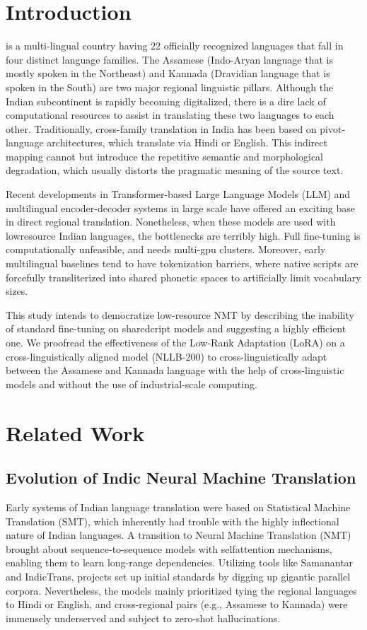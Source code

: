 \documentclass[conference]{IEEEtran}
\begin{document}
\section{Introduction}
 is a multi-lingual country having 22 officially recognized languages that fall in four distinct language families. The Assamese (Indo-Aryan language that is mostly spoken in the Northeast) and Kannada (Dravidian language that is spoken in the South) are two major regional linguistic pillars. Although the Indian subcontinent is rapidly becoming digitalized, there is a dire lack of computational resources to assist in translating these two languages to each other. Traditionally, cross-family translation in India has been based on pivot-language architectures, which translate via Hindi or English. This indirect mapping cannot but introduce the repetitive semantic and morphological degradation, which usually distorts the pragmatic meaning of the source text.

Recent developments in Transformer-based Large Language Models (LLM) and multilingual encoder-decoder systems in large scale have offered an exciting base in direct regional translation. Nonetheless, when these models are used with lowresource Indian languages, the bottlenecks are terribly high. Full fine-tuning is computationally unfeasible, and needs multi-gpu clusters. Moreover, early multilingual baselines tend to have tokenization barriers, where native scripts are forcefully transliterized into shared phonetic spaces to artificially limit vocabulary sizes.

This study intends to democratize low-resource NMT by describing the inability of standard fine-tuning on sharedcript models and suggesting a highly efficient one. We proofread the effectiveness of the Low-Rank Adaptation (LoRA) on a cross-linguistically aligned model (NLLB-200) to cross-linguistically adapt between the Assamese and Kannada language with the help of cross-linguistic models and without the use of industrial-scale computing.
\section{Related Work}

\subsection{Evolution of Indic Neural Machine Translation}
Early systems of Indian language translation were based on Statistical Machine Translation (SMT), which inherently had trouble with the highly inflectional nature of Indian languages. A transition to Neural Machine Translation (NMT) brought about sequence-to-sequence models with selfattention mechanisms, enabling them to learn long-range dependencies. Utilizing tools like Samanantar and IndicTrans, projects set up initial standards by digging up gigantic parallel corpora. Nevertheless, the models mainly prioritized tying the regional languages to Hindi or English, and cross-regional pairs (e.g., Assamese to Kannada) were immensely underserved and subject to zero-shot hallucinations.
\end{document}
